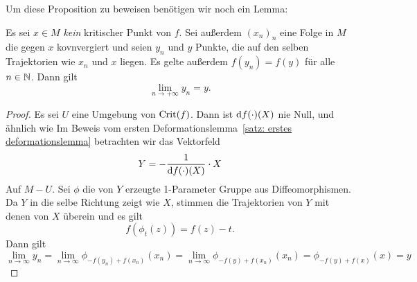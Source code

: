 Um diese Proposition zu beweisen benötigen wir noch ein Lemma:

\begin{lemma}
    \label{lemma: konvergenz einer folge}
    Es sei $x \in M$ \emph{kein} kritischer Punkt von $f$. Sei außerdem $(x_n)_n$ eine Folge in
    $M$ die gegen $x$ kovnvergiert und seien $y_n$ und $y$ Punkte, die auf den selben Trajektorien
    wie $x_n$ und $x$ liegen. Es gelte außerdem $f(y_n) = f(y)$ für alle $n \in { \mathbb N }$. Dann gilt
    \[ \lim_{n \to + \infty} y_n = y . \]
\end{lemma}

\begin{proof}
    Es sei $U$ eine Umgebung von ${ \operatorname{Crit} } (f)$. Dann ist ${ \operatorname{d} } f (\cdot) (X)$ nie Null, und ähnlich wie 
    Im Beweis vom ersten Deformationslemma~\ref{satz: erstes deformationslemma} betrachten wir das
    Vektorfeld 
    \[ Y = - \frac{1}{{ \operatorname{d} } f (\cdot) (X)} \cdot X \]
    Auf $M - U$. Sei $\phi$ die von $Y$ erzeugte 1-Parameter Gruppe aus Diffeomorphismen. 
    Da $Y$ in die selbe Richtung zeigt wie $X$, stimmen die Trajektorien von $Y$ mit denen von $X$ 
    überein und es gilt 
    \[ f(\phi_t(z)) = f(z) - t . \]
    Dann gilt
    \[ \lim_{n \to \infty} y_n 
    = \lim_{n \to \infty} \phi_{- f(y_n) + f(x_n)}(x_n) 
    = \lim_{n \to \infty} \phi_{- f(y) + f(x_n)}(x_n) 
    = \phi_{- f(y) + f(x)}(x) = y \]
\end{proof}

